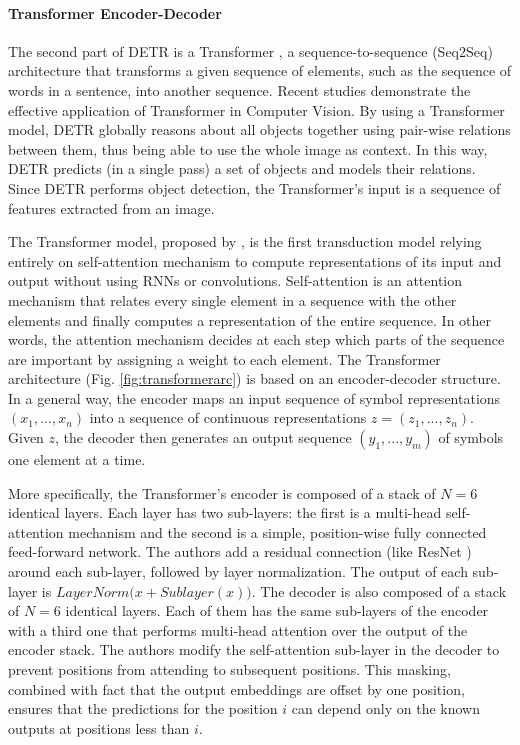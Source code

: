 \paragraph{Transformer Encoder-Decoder} The second part of DETR is a Transformer \cite{transformer}, a sequence-to-sequence (Seq2Seq) architecture that transforms a given sequence of elements, such as the sequence of words in a sentence, into another sequence. Recent studies \cite{surveytransformer} demonstrate the effective application of Transformer in Computer Vision. By using a Transformer model, DETR globally reasons about all objects together using pair-wise relations between them, thus being able to use the whole image as context. In this way, DETR predicts (in a single pass) a set of objects and
models their relations. Since DETR performs object detection, the Transformer's input is a sequence of features extracted from an image.

The Transformer model, proposed by \citeauthor{transformer} \cite{transformer}, is the first transduction model relying entirely on self-attention mechanism to compute representations of its input and output without using RNNs or convolutions. Self-attention is an attention mechanism that relates every single element in a sequence with the other elements and finally computes a representation of the entire sequence. In other words, the attention mechanism decides at each step which parts of the sequence are important by assigning a weight to each element. The Transformer architecture (Fig. \ref{fig:transformerarc}) is based on an encoder-decoder structure. In a general way, the encoder maps an input sequence of symbol representations $(x_1, ..., x_n)$ into a sequence of continuous representations $z = (z_1, ..., z_n)$. Given $z$, the decoder then generates an output sequence $(y_1, ..., y_m)$ of symbols one element at a time.

More specifically, the Transformer's encoder  is composed of a stack of $N = 6$ identical layers. Each layer has two sub-layers: the first is a multi-head self-attention mechanism and the second is a simple, position-wise fully connected feed-forward network. The authors add a residual connection (like ResNet \cite{resnet}) around each sub-layer, followed by layer normalization. The output of each sub-layer is $LayerNorm\big(x + Sublayer(x)\big)$. The decoder is also composed of a stack of $N = 6$ identical layers. Each of them has the same sub-layers of the encoder with a third one that performs multi-head attention over the output of the encoder stack. The authors modify the self-attention
sub-layer in the decoder to prevent positions from attending to subsequent positions. This masking, combined with fact that the output embeddings are offset by one position, ensures that the predictions for the position $i$ can depend only on the known outputs at positions less than $i$.

